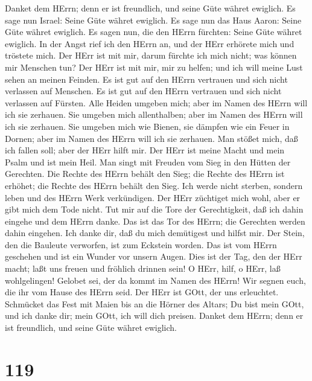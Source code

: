  Danket dem HErrn; denn er ist freundlich, und seine Güte
währet ewiglich.  Es sage nun Israel: Seine Güte währet
ewiglich.  Es sage nun das Haus Aaron: Seine Güte währet
ewiglich.  Es sagen nun, die den HErrn fürchten: Seine Güte
währet ewiglich.  In der Angst rief ich den HErrn an, und
der HErr erhörete mich und tröstete mich.  Der HErr ist mit
mir, darum fürchte ich mich nicht; was können mir Menschen tun?
 Der HErr ist mit mir, mir zu helfen; und ich will meine
Lust sehen an meinen Feinden.  Es ist gut auf den HErrn
vertrauen und sich nicht verlassen auf Menschen.  Es ist gut
auf den HErrn vertrauen und sich nicht verlassen auf Fürsten.
 Alle Heiden umgeben mich; aber im Namen des HErrn will ich
sie zerhauen.  Sie umgeben mich allenthalben; aber im Namen
des HErrn will ich sie zerhauen.  Sie umgeben mich wie
Bienen, sie dämpfen wie ein Feuer in Dornen; aber im Namen des HErrn
will ich sie zerhauen.  Man stößet mich, daß ich fallen
soll; aber der HErr hilft mir.  Der HErr ist meine Macht
und mein Psalm und ist mein Heil.  Man singt mit Freuden
vom Sieg in den Hütten der Gerechten. Die Rechte des HErrn behält den
Sieg;  die Rechte des HErrn ist erhöhet; die Rechte des
HErrn behält den Sieg.  Ich werde nicht sterben, sondern
leben und des HErrn Werk verkündigen.  Der HErr züchtiget
mich wohl, aber er gibt mich dem Tode nicht.  Tut mir auf
die Tore der Gerechtigkeit, daß ich dahin eingehe und dem HErrn danke.
 Das ist das Tor des HErrn; die Gerechten werden dahin
eingehen.  Ich danke dir, daß du mich demütigest und hilfst
mir.  Der Stein, den die Bauleute verworfen, ist zum
Eckstein worden.  Das ist vom HErrn geschehen und ist ein
Wunder vor unsern Augen.  Dies ist der Tag, den der HErr
macht; laßt uns freuen und fröhlich drinnen sein!  O HErr,
hilf, o HErr, laß wohlgelingen!  Gelobet sei, der da kommt
im Namen des HErrn! Wir segnen euch, die ihr vom Hause des HErrn seid.
 Der HErr ist GOtt, der uns erleuchtet. Schmücket das Fest
mit Maien bis an die Hörner des Altars;  Du bist mein GOtt,
und ich danke dir; mein GOtt, ich will dich preisen. 
Danket dem HErrn; denn er ist freundlich, und seine Güte währet
ewiglich.

\hypertarget{section-118}{%
\section{119}\label{section-118}}

